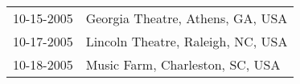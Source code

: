\begin{supertabular}{ll}
 10-15-2005 &   Georgia Theatre, Athens, GA, USA \\
 10-17-2005 &  Lincoln Theatre, Raleigh, NC, USA \\
 10-18-2005 &    Music Farm, Charleston, SC, USA \\
\end{supertabular}
